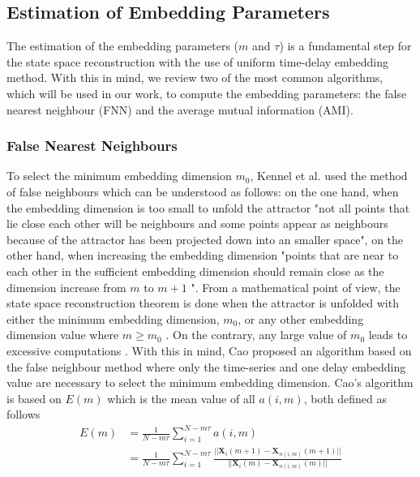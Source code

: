 \documentclass[fleqn,10pt]{wlscirep}
\begin{document}
\subsection*{Estimation of Embedding Parameters}
The estimation of the embedding parameters ($m$ and $\tau$) 
is a fundamental step for the state space reconstruction with the use
of uniform time-delay embedding method.
With this in mind, we review two of the most common algorithms,
which will be used in our work, to compute the embedding
parameters: the false nearest neighbour (FNN) and the average mutual information (AMI).

\subsubsection*{False Nearest Neighbours}
To select the minimum embedding dimension $m_0$, Kennel et al. \cite{kennel1992}
used the method of false neighbours which can be understood as follows:
on the one hand, when the embedding dimension is too small to unfold the 
attractor "not all points that lie close each other will be neighbours and 
some points appear as neighbours because of the attractor has been projected 
down into an smaller space", on the other hand, when increasing the embedding 
dimension "points that are near to each other in the sufficient
embedding dimension should remain close as the dimension increase from $m$ 
to $m+1$ \cite{krakovska2015}".
From a mathematical point of view, the state space reconstruction theorem is 
done when the attractor is unfolded with either the minimum embedding 
dimension, $m_0$, or any other embedding dimension value where 
$m \ge m_0$ \cite{kennel1992}. On the contrary, any large value of $m_0$ 
leads to excessive computations \cite{bradley2015}. With this in mind, 
Cao \cite{Cao1997} proposed an algorithm based on the false neighbour method 
where only the time-series and one delay embedding value are necessary 
to select the minimum embedding dimension. Cao's algorithm is based 
on $E(m)$  which is the mean value of all $a(i,m)$, both defined as follows
\begin{equation}\label{eq:e}
  \begin{aligned}
	E(m) &= \frac{1}{N-m\tau} \sum_{i=1}^{N-m\tau} a(i,m) \\
	 &=
       \frac{1}{N-m\tau} \sum_{i=1}^{N-m\tau}
       \frac{ || \boldsymbol{X}_i(m+1) - \boldsymbol{X}_{n(i,m)}(m+1) || }
            { || \boldsymbol{X}_i(m) - \boldsymbol{X}_{n(i,m)}(m) ||  }
  \end{aligned}
\end{equation}
\end{document}
